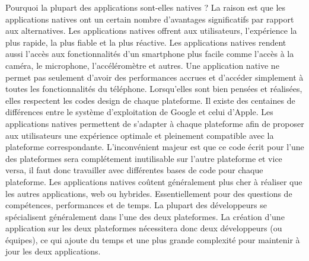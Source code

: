 Pourquoi la plupart des applications sont-elles natives ? La raison est que les applications natives ont un certain nombre d’avantages significatifs par rapport aux alternatives. 
Les applications natives offrent aux utilisateurs, l’expérience la plus rapide, la plus fiable et la plus réactive. Les applications natives rendent aussi l'accès aux fonctionnalités d'un smartphone plus facile comme l’accès à la caméra, le microphone, l’accéléromètre et autres. Une application native ne permet pas seulement d’avoir des performances accrues et d’accéder simplement à toutes les fonctionnalités du téléphone. Lorsqu’elles sont bien pensées et réalisées, elles respectent les codes design de chaque plateforme. Il existe des centaines de différences entre le système d’exploitation de Google et celui d’Apple. Les applications natives permettent de s’adapter à chaque plateforme afin de proposer aux utilisateurs une expérience optimale et pleinement compatible avec la plateforme correspondante. L'inconvénient majeur est que ce code écrit pour l'une des plateformes sera complétement inutilisable sur l’autre plateforme et vice versa, il faut donc travailler avec différentes bases de code pour chaque plateforme. Les applications natives coûtent généralement plus cher à réaliser que les autres applications, web ou hybrides. Essentiellement pour des questions de compétences, performances et de temps. La plupart des développeurs se spécialisent généralement dans l’une des deux plateformes. La création d’une application sur les deux plateformes nécessitera donc deux développeurs (ou équipes), ce qui ajoute du temps et une plus grande complexité pour maintenir à jour les deux applications.



